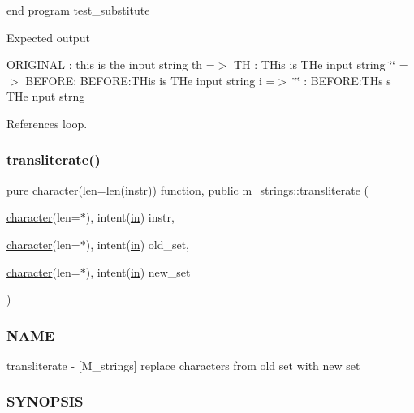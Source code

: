 end program test\+\_\+substitute

Expected output

O\+R\+I\+G\+I\+N\+AL \+: this is the input string th =$>$ TH \+: T\+His is T\+He input string \char`\"{}\char`\"{} =$>$ B\+E\+F\+O\+RE\+: B\+E\+F\+O\+RE\+:T\+His is T\+He input string i =$>$ \char`\"{}\char`\"{} \+: B\+E\+F\+O\+RE\+:T\+Hs s T\+He nput strng 

References loop.

\mbox{\label{namespacem__strings_aaee428861205782e002f5e7e8fb002f0}} 
\subsubsection{\texorpdfstring{transliterate()}{transliterate()}}
{\footnotesize\ttfamily pure \hyperlink{option__stopwatch_83_8txt_abd4b21fbbd175834027b5224bfe97e66}{character}(len=len(instr)) function, \hyperlink{M__stopwatch_83_8txt_a2f74811300c361e53b430611a7d1769f}{public} m\+\_\+strings\+::transliterate (\begin{DoxyParamCaption}\item[{\hyperlink{option__stopwatch_83_8txt_abd4b21fbbd175834027b5224bfe97e66}{character}(len=$\ast$), intent(\hyperlink{M__journal_83_8txt_afce72651d1eed785a2132bee863b2f38}{in})}]{instr,  }\item[{\hyperlink{option__stopwatch_83_8txt_abd4b21fbbd175834027b5224bfe97e66}{character}(len=$\ast$), intent(\hyperlink{M__journal_83_8txt_afce72651d1eed785a2132bee863b2f38}{in})}]{old\+\_\+set,  }\item[{\hyperlink{option__stopwatch_83_8txt_abd4b21fbbd175834027b5224bfe97e66}{character}(len=$\ast$), intent(\hyperlink{M__journal_83_8txt_afce72651d1eed785a2132bee863b2f38}{in})}]{new\+\_\+set }\end{DoxyParamCaption})}



\subsubsection*{N\+A\+ME}

transliterate -\/ \mbox{[}M\+\_\+strings\mbox{]} replace characters from old set with new set 

\subsubsection*{S\+Y\+N\+O\+P\+S\+IS}

